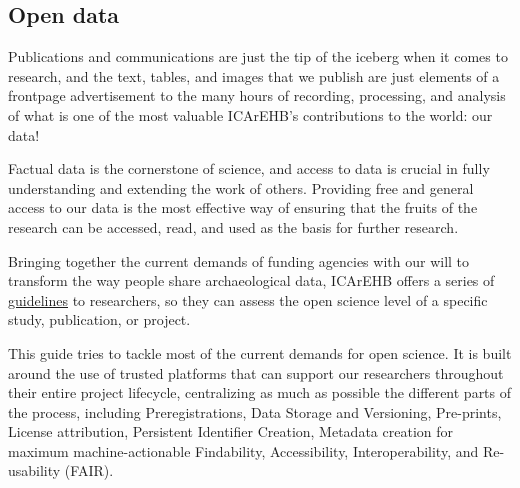\documentclass[
  letterpaper,
  DIV=11,
  numbers=noendperiod]{scrreprt}
\begin{document}
\hypertarget{open-data}{%
\subsection{Open data}\label{open-data}}

Publications and communications are just the tip of the iceberg when it
comes to research, and the text, tables, and images that we publish are
just elements of a frontpage advertisement to the many hours of
recording, processing, and analysis of what is one of the most valuable
ICArEHB's contributions to the world: our data!

Factual data is the cornerstone of science, and access to data is
crucial in fully understanding and extending the work of others.
Providing free and general access to our data is the most effective way
of ensuring that the fruits of the research can be accessed, read, and
used as the basis for further research.

Bringing together the current demands of funding agencies with our will
to transform the way people share archaeological data, ICArEHB offers a
series of \href{intro.qmd}{guidelines} to researchers, so they can
assess the open science level of a specific study, publication, or
project.

This guide tries to tackle most of the current demands for open science.
It is built around the use of trusted platforms that can support our
researchers throughout their entire project lifecycle, centralizing as
much as possible the different parts of the process, including
Preregistrations, Data Storage and Versioning, Pre-prints, License
attribution, Persistent Identifier Creation, Metadata creation for
maximum machine-actionable Findability, Accessibility, Interoperability,
and Re-usability (FAIR).
\end{document}
